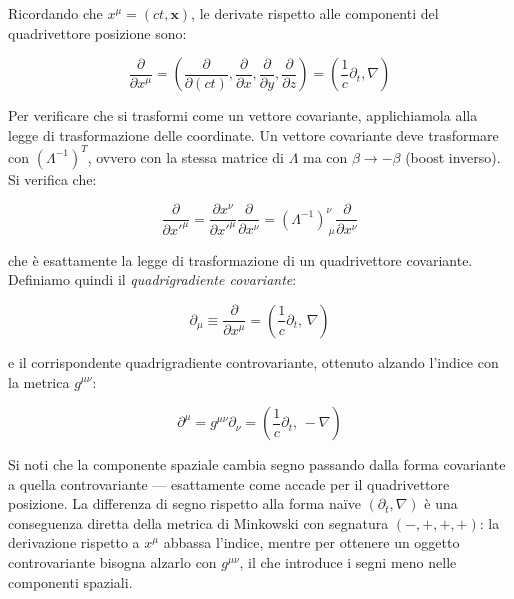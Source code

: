 Ricordando che $x^\mu = (ct, \mathbf{x})$, le derivate rispetto alle componenti del quadrivettore posizione sono:

\begin{equation}
    \frac{\partial}{\partial x^\mu} = \left(\frac{\partial}{\partial(ct)}, \frac{\partial}{\partial x}, \frac{\partial}{\partial y}, \frac{\partial}{\partial z}\right) = \left(\frac{1}{c}\partial_t, \nabla\right)
\end{equation}

Per verificare che si trasformi come un vettore covariante, applichiamola alla legge di trasformazione delle coordinate. 
Un vettore covariante deve trasformare con $(\Lambda^{-1})^T$, ovvero con la stessa matrice di $\Lambda$ ma con $\beta \to -\beta$ (boost inverso). Si verifica che:

\begin{equation}
    \frac{\partial}{\partial x'^\mu} = \frac{\partial x^\nu}{\partial x'^\mu}\frac{\partial}{\partial x^\nu} = (\Lambda^{-1})^\nu_{\ \mu}\frac{\partial}{\partial x^\nu}
\end{equation}

che è esattamente la legge di trasformazione di un quadrivettore covariante. Definiamo quindi il \emph{quadrigradiente covariante}: 

\begin{tcolorbox}[colback=yellow!10!white, colframe=orange!70!black, boxrule=0.8pt]
\begin{equation}\label{eq: quadrigradiente_covariante}
    \partial_\mu \equiv \frac{\partial}{\partial x^\mu} = \left(\frac{1}{c}\partial_t,\, \nabla\right)
\end{equation}
\end{tcolorbox}

e il corrispondente quadrigradiente controvariante, ottenuto alzando l'indice con la metrica $g^{\mu\nu}$:

\begin{tcolorbox}[colback=yellow!10!white, colframe=orange!70!black, boxrule=0.8pt]
\begin{equation}\label{eq: quadrigradiente_controvariante}
    \partial^\mu = g^{\mu\nu}\partial_\nu = 
    \left(\frac{1}{c}\partial_t,\, -\nabla\right)
\end{equation}
\end{tcolorbox}

Si noti che la componente spaziale cambia segno passando dalla forma covariante a quella controvariante — esattamente come accade per il quadrivettore posizione. La differenza di segno rispetto alla forma naïve $(\partial_t, \nabla)$ è una conseguenza diretta della metrica di Minkowski con segnatura $(-,+,+,+)$: la derivazione rispetto a $x^\mu$ abbassa l'indice, mentre per ottenere un oggetto controvariante bisogna alzarlo con $g^{\mu\nu}$, il che introduce i segni meno nelle componenti spaziali.\\

